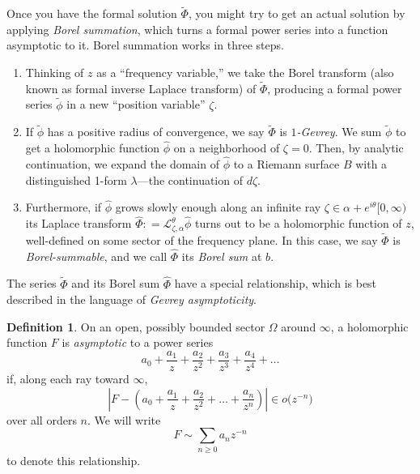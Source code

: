 \documentclass{article}
\newcommand{\series}[1]{\tilde{#1}}
\newcommand{\laplace}{\mathcal{L}}
\theoremstyle{definition}
\newtheorem{defn}{Definition}
\theoremstyle{plain}
\begin{document}
Once you have the formal solution $\series{\Phi}$, you might try to get an actual solution by applying {\em Borel summation}, which turns a formal power series into a function asymptotic to it. Borel summation works in three steps.
\begin{enumerate}
\item Thinking of $z$ as a ``frequency variable,'' we take the Borel transform (also known as formal inverse Laplace transform) of $\series{\Phi}$, producing a formal power series $\series{\phi}$ in a new ``position variable'' $\zeta$.
\item If $\series{\phi}$ has a positive radius of convergence, we say $\series{\Phi}$ is {\em $1$-Gevrey}. We sum $\series{\phi}$ to get a holomorphic function $\hat{\phi}$ on a neighborhood of $\zeta = 0$. Then, by analytic continuation, we expand the domain of $\hat{\phi}$ to a Riemann surface $B$ with a distinguished 1-form $\lambda$---the continuation of $d\zeta$. %
\item Furthermore, if $\hat{\phi}$ grows slowly enough along an infinite ray $\zeta \in \alpha + e^{i\theta}[0, \infty)$ its Laplace transform $\hat{\Phi} : = \laplace_{\zeta, \alpha}^\theta \hat{\phi}$ turns out to be a holomorphic function of $z$, well-defined on some sector of the frequency plane. In this case, we say $\tilde{\Phi}$ is {\em Borel-summable}, and we call $\hat{\Phi}$ its {\em Borel sum} at $b$. 
\end{enumerate}
The series $\series{\Phi}$ and its Borel sum $\hat{\Phi}$ have a special relationship, which is best described in the language of {\em Gevrey asymptoticity}. %
\begin{defn}
On an open, possibly bounded sector $\Omega$ around $\infty$, a holomorphic function $F$ is {\em asymptotic} to a power series
\begin{equation}\label{series:asymp-defn}
a_0 + \frac{a_1}{z} + \frac{a_2}{z^2} + \frac{a_3}{z^3} + \frac{a_4}{z^4} + \ldots
\end{equation}
if, along each ray toward $\infty$,
\[ \left|F - \left(a_0 + \frac{a_1}{z} + \frac{a_2}{z^2} + \ldots + \frac{a_n}{z^n} \right) \right| \in o\big(z^{-n}\big) \]
over all orders $n$. We will write
\[ F \sim \sum_{n \geq 0} a_n z^{-n} \]
to denote this relationship.
\end{defn}
\end{document}
